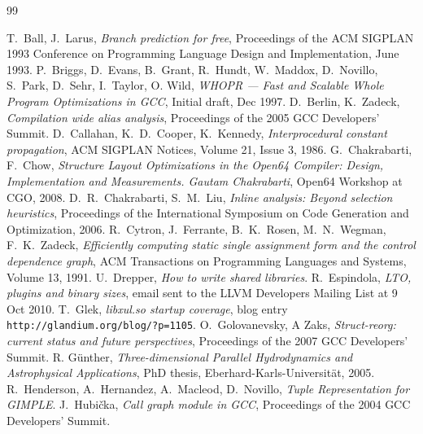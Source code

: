 \documentclass[final]{ols}
\begin{document}
\begin{thebibliography}{99}
\raggedright
{} T.\ Ball, J.\ Larus, {\em Branch prediction for free}, Proceedings of the ACM SIGPLAN 1993 Conference on Programming Language Design and Implementation, June 1993.
 P.\ Briggs, D.\ Evans, B.\ Grant, R.\ Hundt, W.~Maddox, D.\ Novillo, S.\ Park, D.\ Sehr, I.~Taylor, O. Wild, {\em WHOPR --- Fast and Scalable Whole Program Optimizations in GCC}, Initial draft, Dec 1997.
 D.~Berlin, K.~Zadeck, {\em Compilation wide alias analysis}, Proceedings of the 2005 GCC Developers' Summit.
 D.~Callahan, K.~D.~Cooper, K.~Kennedy, {\em Interprocedural constant propagation}, ACM SIGPLAN Notices, Volume 21, Issue 3, 1986.
 G.~Chakrabarti, F.~Chow, {\em Structure Layout Optimizations in the Open64 Compiler: Design, Implementation and Measurements. Gautam Chakrabarti}, Open64 Workshop at CGO, 2008.
 D.~R.~Chakrabarti, S.~M.~Liu, {\em Inline analysis: Beyond selection heuristics}, Proceedings of the International Symposium on Code Generation and Optimization, 2006.
 R.\ Cytron, J.\, Ferrante, B.\ K.\ Rosen, M.~N.~Wegman, F.\ K.\ Zadeck, {\em Efficiently computing static single assignment form and the control dependence graph}, ACM Transactions on Programming Languages and Systems, Volume 13, 1991.
 U.\ Drepper, {\em How to write shared libraries}.
 R.~Espindola, {\em LTO, plugins and binary sizes}, email sent to the LLVM Developers Mailing List at 9 Oct 2010.
 T.~Glek, {\em libxul.so startup coverage}, blog entry {\tt http://glandium.org/blog/?p=1105}.
 O.~Golovanevsky, A Zaks, {\em Struct-reorg: current status and future perspectives}, Proceedings of the 2007 GCC Developers' Summit.
 R. G\"unther, {\em Three-dimensional Parallel Hydrodynamics and Astrophysical Applications}, PhD thesis, Eberhard-Karls-Universit\"at, 2005.
 R.\ Henderson, A.\ Hernandez, A.\ Macleod, D.\ Novillo, {\em Tuple Representation for GIMPLE}.
 J.\ Hubi\v cka, {\em Call graph module in GCC}, Proceedings of the 2004 GCC Developers' Summit.

\end{thebibliography}
\end{document}
